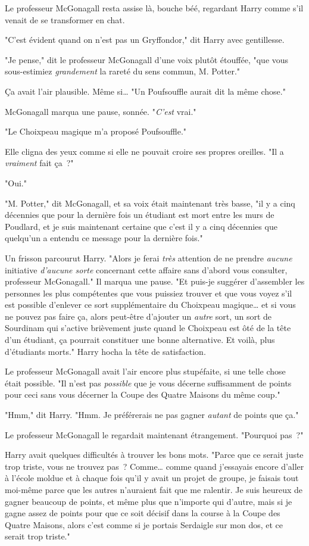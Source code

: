 Le professeur McGonagall resta assise là, bouche béé, regardant Harry comme s'il venait de se transformer en chat.

"C'est évident quand on n'est pas un Gryffondor," dit Harry avec gentillesse.

"Je pense," dit le professeur McGonagall d'une voix plutôt étouffée, "que vous sous-estimiez \emph{grandement} la rareté du sens commun, M. Potter."

Ça avait l'air plausible. Même si… "Un Poufsouffle aurait dit la même chose."

McGonagall marqua une pause, sonnée. "\emph{C'est} vrai."

"Le Choixpeau magique m'a proposé Poufsouffle."

Elle cligna des yeux comme si elle ne pouvait croire ses propres oreilles. "Il a \emph{vraiment} fait ça~?"

"Oui."

"M. Potter," dit McGonagall, et sa voix était maintenant très basse, "il y a cinq décennies que pour la dernière fois un étudiant est mort entre les murs de Poudlard, et je suis maintenant certaine que c'est il y a cinq décennies que quelqu'un a entendu ce message pour la dernière fois."

Un frisson parcourut Harry. "Alors je ferai \emph{très} attention de ne prendre \emph{aucune} initiative \emph{d'aucune sorte} concernant cette affaire sans d'abord vous consulter, professeur McGonagall." Il marqua une pause. "Et puis-je suggérer d'assembler les personnes les plus compétentes que vous puissiez trouver et que vous voyez s'il est possible d'enlever ce sort supplémentaire du Choixpeau magique… et si vous ne pouvez pas faire ça, alors peut-être d'ajouter un \emph{autre} sort, un sort de Sourdinam qui s'active brièvement juste quand le Choixpeau est ôté de la tête d'un étudiant, ça pourrait constituer une bonne alternative. Et voilà, plus d'étudiants morts." Harry hocha la tête de satisfaction.

Le professeur McGonagall avait l'air encore plus stupéfaite, si une telle chose était possible. "Il n'est pas \emph{possible} que je vous décerne suffisamment de points pour ceci sans vous décerner la Coupe des Quatre Maisons du même coup."

"Hmm," dit Harry. "Hmm. Je préférerais ne pas gagner \emph{autant} de points que ça."

Le professeur McGonagall le regardait maintenant étrangement. "Pourquoi pas~?"

Harry avait quelques difficultés à trouver les bons mots. "Parce que ce serait juste trop triste, vous ne trouvez pas~? Comme… comme quand j'essayais encore d'aller à l'école moldue et à chaque fois qu'il y avait un projet de groupe, je faisais tout moi-même parce que les autres n'auraient fait que me ralentir. Je suis heureux de gagner beaucoup de points, et même plus que n'importe qui d'autre, mais si je gagne assez de points pour que ce soit décisif dans la course à la Coupe des Quatre Maisons, alors c'est comme si je portais Serdaigle sur mon dos, et ce serait trop triste."

